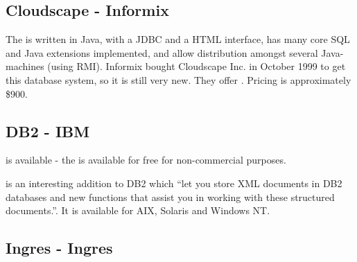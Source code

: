 

\subsection{Cloudscape - Informix}
\label{sec:cloudscape}

The
 is written in Java, with a JDBC and a HTML interface, has
many core SQL and Java extensions implemented, and allow distribution
amongst several Java-machines (using RMI).  Informix bought Cloudscape
Inc. in October 1999 to get this database system, so it is still very
new.  They offer
.  Pricing is approximately \$900.


\subsection{DB2 - IBM}
\label{sec:db2}

is available - the
 is available for free for non-commercial
purposes.

 is an interesting addition to DB2 which ``let you
store XML documents in DB2 databases and new functions that assist you
in working with these structured documents.''.  It is available for
AIX, Solaris and Windows NT. 

  



 
\subsection{Ingres - Ingres}
\label{sec:ingres}

